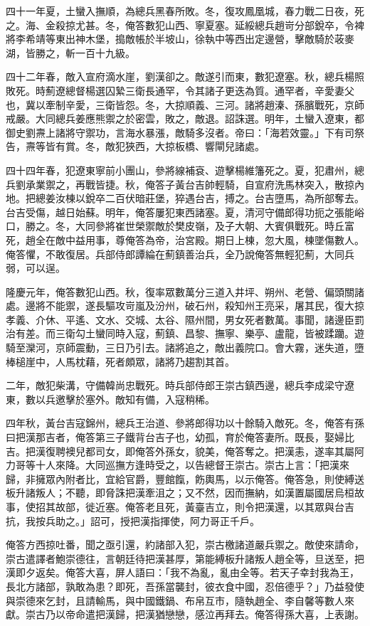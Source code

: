 \begin{pinyinscope}
四十一年夏，土蠻入撫順，為總兵黑春所敗。冬，復攻鳳凰城，春力戰二日夜，死之。海、金殺掠尤甚。冬，俺答數犯山西、寧夏塞。延綏總兵趙岢分部銳卒，令裨將李希靖等東出神木堡，搗敵帳於半坡山，徐執中等西出定邊營，擊敵騎於荍麥湖，皆勝之，斬一百十九級。

四十二年春，敵入宣府滴水崖，劉漢卻之。敵遂引而東，數犯遼塞。秋，總兵楊照敗死。時薊遼總督楊選囚縶三衛長通罕，令其諸子更迭為質。通罕者，辛愛妻父也，冀以牽制辛愛，三衛皆怨。冬，大掠順義、三河。諸將趙溱、孫臏戰死，京師戒嚴。大同總兵姜應熊禦之於密雲，敗之，敵退。詔誅選。明年，土蠻入遼東，都御史劉燾上諸將守禦功，言海水暴漲，敵騎多沒者。帝曰：「海若效靈。」下有司祭告，燾等皆有賞。冬，敵犯狹西，大掠板橋、響閘兒諸處。

四十四年春，犯遼東寧前小團山，參將線補袞、遊擊楊維籓死之。夏，犯肅州，總兵劉承業禦之，再戰皆捷。秋，俺答子黃台吉帥輕騎，自宣府洗馬林突入，散掠內地。把總姜汝棟以銳卒二百伏暗莊堡，猝遇台吉，搏之。台吉墮馬，為所部奪去。台吉受傷，越日始蘇。明年，俺答屢犯東西諸塞。夏，清河守備郎得功扼之張能峪口，勝之。冬，大同參將崔世榮禦敵於樊皮嶺，及子大朝、大賓俱戰死。時丘富死，趙全在敵中益用事，尊俺答為帝，治宮殿。期日上棟，忽大風，棟墜傷數人。俺答懼，不敢復居。兵部侍郎譚綸在薊鎮善治兵，全乃說俺答無輕犯薊，大同兵弱，可以逞。

隆慶元年，俺答數犯山西。秋，復率眾數萬分三道入井坪、朔州、老營、偏頭關諸處。邊將不能禦，遂長驅攻岢嵐及汾州，破石州，殺知州王亮采，屠其民，復大掠孝義、介休、平遙、文水、交城、太谷、隰州間，男女死者數萬。事聞，諸邊臣罰治有差。而三衛勾土蠻同時入寇，薊鎮、昌黎、撫寧、樂亭、盧龍，皆被蹂躪。遊騎至灤河，京師震動，三日乃引去。諸將追之，敵出義院口。會大霧，迷失道，墮棒槌崖中，人馬枕藉，死者頗眾，諸將乃趨割其首。

二年，敵犯柴溝，守備韓尚忠戰死。時兵部侍郎王崇古鎮西邊，總兵李成梁守遼東，數以兵邀擊於塞外。敵知有備，入寇稍稀。

四年秋，黃台吉寇錦州，總兵王治道、參將郎得功以十餘騎入敵死。冬，俺答有孫曰把漢那吉者，俺答第三子鐵背台吉子也，幼孤，育於俺答妻所。既長，娶婦比吉。把漢復聘襖兒都司女，即俺答外孫女，貌美，俺答奪之。把漢恚，遂率其屬阿力哥等十人來降。大同巡撫方逢時受之，以告總督王崇古。崇古上言：「把漢來歸，非擁眾內附者比，宜給官爵，豐館餼，飭輿馬，以示俺答。俺答急，則使縛送板升諸叛人；不聽，即脅誅把漢牽沮之；又不然，因而撫納，如漢置屬國居烏桓故事，使招其故部，徙近塞。俺答老且死，黃臺吉立，則令把漢還，以其眾與台吉抗，我按兵助之。」詔可，授把漢指揮使，阿力哥正千戶。

俺答方西掠吐番，聞之亟引還，約諸部入犯，崇古檄諸道嚴兵禦之。敵使來請命，崇古遣譯者鮑崇德往，言朝廷待把漢甚厚，第能縛板升諸叛人趙全等，旦送至，把漢即夕返矣。俺答大喜，屏人語曰：「我不為亂，亂由全等。若天子幸封我為王，長北方諸部，孰敢為患？即死，吾孫當襲封，彼衣食中國，忍倍德乎？」乃益發使與崇德來乞封，且請輸馬，與中國鐵鍋、布帛互市，隨執趙全、李自馨等數人來獻。崇古乃以帝命遣把漢歸，把漢猶戀戀，感泣再拜去。俺答得孫大喜，上表謝。


\end{pinyinscope}

